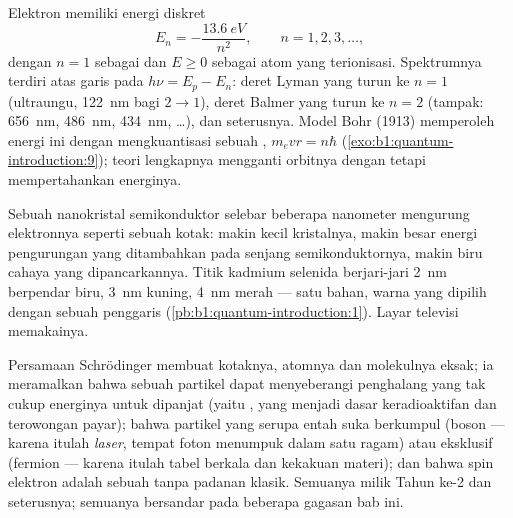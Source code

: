 \begin{proposition}\label{prop:b1:quantum-introduction:hydrogen}
Elektron  memiliki energi diskret
\[
E_n = -\frac{\qty{13.6}{eV}}{n^2} , \qquad n = 1, 2, 3, \ldots ,
\]
dengan $n = 1$ sebagai  dan $E \geq 0$ sebagai atom yang terionisasi. Spektrumnya
terdiri atas garis pada $h\nu = E_p - E_n$: deret Lyman yang turun
ke $n = 1$ (ultraungu, \qty{122}{nm} bagi $2 \to 1$), deret Balmer yang
turun ke $n = 2$ (tampak: \qty{656}{nm}, \qty{486}{nm}, \qty{434}{nm}, \ldots),
dan seterusnya. Model Bohr (1913) memperoleh energi ini dengan mengkuantisasi
 sebuah , $m_evr = n\hbar$
(\cref{exo:b1:quantum-introduction:9}); teori lengkapnya mengganti orbitnya dengan
 tetapi mempertahankan energinya.
\end{proposition}
\admitted

\begin{example}\label{ex:b1:quantum-introduction:dot}
Sebuah nanokristal semikonduktor selebar beberapa nanometer mengurung
elektronnya seperti sebuah kotak: makin kecil kristalnya, makin besar
energi pengurungan yang ditambahkan pada senjang semikonduktornya, makin biru
cahaya yang dipancarkannya. Titik kadmium selenida berjari-jari \qty{2}{nm} berpendar biru,
\qty{3}{nm} kuning, \qty{4}{nm} merah --- satu bahan, warna yang dipilih dengan
sebuah penggaris (\cref{pb:b1:quantum-introduction:1}). Layar televisi memakainya.
\end{example}

\begin{remark}\label{rem:b1:quantum-introduction:rest}
Persamaan Schrödinger membuat kotaknya, atomnya dan molekulnya
eksak; ia meramalkan bahwa sebuah partikel dapat menyeberangi penghalang yang tak cukup
energinya untuk dipanjat (yaitu \emph{}, yang menjadi dasar keradioaktifan dan
 terowongan payar); bahwa partikel yang serupa entah
suka berkumpul (boson --- karena itulah \emph{laser}, tempat foton menumpuk dalam satu
ragam) atau eksklusif (fermion --- karena itulah tabel berkala dan
kekakuan materi); dan bahwa spin elektron adalah sebuah 
tanpa padanan klasik. Semuanya milik Tahun ke-2 dan seterusnya;
semuanya bersandar pada beberapa gagasan bab ini.
\end{remark}

